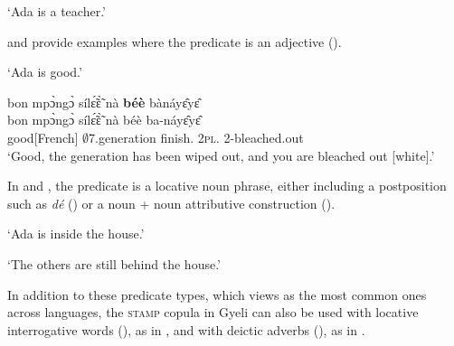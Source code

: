     \trans `Ada is a teacher.'
\z

\noindent {} and  provide examples where the predicate is an adjective ().

    \trans `Ada is good.'
\z

\ea \label{IDcol}
  \glll bon mpɔ̀ngɔ̀ sílɛ̃́ɛ̃̀ nà {\bfseries béè} bànáyɛ̂yɛ̂\\
        bon mpɔ̀ngɔ̀ sílɛ̃́ɛ̃̀ nà béè ba-náyɛ̂yɛ̂  \\
      good[French] $\emptyset$7.generation finish.{\COMPL} {\CONJ} 2\textsc{pl}.{\COP} 2-bleached.out\\
    \trans `Good, the generation has been wiped out, and you are bleached out [white].'
\z


\noindent  In  and , the predicate is a locative noun phrase, either including a postposition such as {\itshape dé} () or a noun + noun attributive construction ().

    \trans `Ada is inside the house.'
\z


    \trans `The others are still behind the house.'
\z


\noindent In addition to these predicate types, which \citet{dryer2007a} views as the most common ones across languages, the \textsc{stamp} copula in Gyeli can also be used with locative interrogative words (), as in , and with deictic adverbs (), as in .


